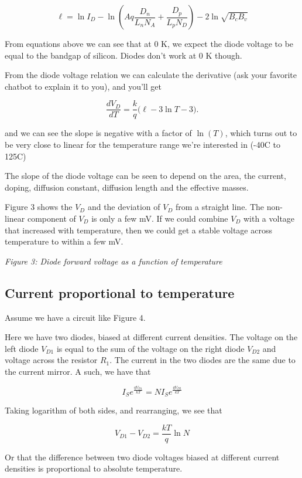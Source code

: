 \[ \ell= \ln{I_D} - \ln{\left (Aq\frac{D_n}{L_n N_A} +
\frac{D_p}{L_p N_D}\right)}  - 2 \ln{\sqrt{B_c B_v}} \]

From equations above we can see that at 0 K, we expect the diode voltage
to be equal to the bandgap of silicon. Diodes don't work at 0 K though.

From the diode voltage relation we can calculate the derivative (ask
your favorite chatbot to explain it to you), and you'll get

\[ \frac{dV_D}{dT} = \frac{k}{q}\bigl(\ell - 3 \ln T - 3\bigr). \]

and we can see the slope is negative with a factor of \(\ln(T)\), which
turns out to be very close to linear for the temperature range we're
interested in (-40C to 125C)

The slope of the diode voltage can be seen to depend on the area, the
current, doping, diffusion constant, diffusion length and the effective
masses.

Figure 3 shows the \(V_D\) and the deviation of \(V_D\) from a straight
line. The non-linear component of \(V_D\) is only a few mV. If we could
combine \(V_D\) with a voltage that increased with temperature, then we
could get a stable voltage across temperature to within a few mV.


{
\centering
{}
}

\emph{Figure 3: Diode forward voltage as a function of temperature}

\subsection{Current proportional to
temperature}\label{current-proportional-to-temperature}

Assume we have a circuit like Figure 4.

Here we have two diodes, biased at different current densities. The
voltage on the left diode \(V_{D1}\) is equal to the sum of the voltage
on the right diode \(V_{D2}\) and voltage across the resistor \(R_1\).
The current in the two diodes are the same due to the current mirror. A
such, we have that

\[ I_S e^\frac{qV_{D1}}{kT} = N I_S e^\frac{qV_{D2}}{kT} \]

Taking logarithm of both sides, and rearranging, we see that

\[ V_{D1} - V_{D2} = \frac{kT}{q}\ln{N}\]

Or that the difference between two diode voltages biased at different
current densities is proportional to absolute temperature.

